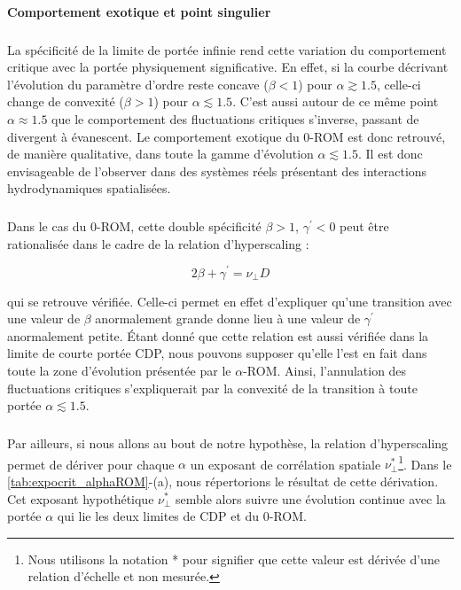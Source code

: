 \paragraph{Comportement exotique et point singulier}

\subparagraph{}La spécificité de la limite de portée infinie rend cette variation du comportement critique avec la portée physiquement significative. En effet, si la courbe décrivant l'évolution du paramètre d'ordre reste concave ($\beta < 1$) pour $\alpha \gtrsim 1.5$, celle-ci change de convexité ($\beta >1$) pour $\alpha \lesssim 1.5$. C'est aussi autour de ce même point $\alpha \approx 1.5$ que le comportement des fluctuations critiques s'inverse, passant de divergent à évanescent. Le comportement exotique du 0-ROM est donc retrouvé, de manière qualitative, dans toute la gamme d'évolution $\alpha \lesssim 1.5$. Il est donc envisageable de l'observer dans des systèmes réels présentant des interactions hydrodynamiques spatialisées.

\subparagraph{}Dans le cas du 0-ROM, cette double spécificité $\beta>1$, $\gamma^\prime<0$ peut être rationalisée dans le cadre de la relation d'hyperscaling \cite{lubeck_universal_2004, mari_absorbing_2022} :

\begin{equation}
	2\beta + \gamma^\prime = \nu_\perp D
\end{equation}

\noindent qui se retrouve vérifiée. Celle-ci permet en effet d'expliquer qu'une transition avec une valeur de $\beta$ anormalement grande donne lieu à une valeur de $\gamma^\prime$ anormalement petite. Étant donné que cette relation est aussi vérifiée dans la limite de courte portée CDP, nous pouvons supposer qu'elle l'est en fait dans toute la zone d'évolution présentée par le $\alpha$-ROM. Ainsi, l'annulation des fluctuations critiques s'expliquerait par la convexité de la transition à toute portée $\alpha \lesssim 1.5$.

\subparagraph{}Par ailleurs, si nous allons au bout de notre hypothèse, la relation d'hyperscaling permet de dériver pour chaque $\alpha$ un exposant de corrélation spatiale $\nu_\perp^*$\footnote{Nous utilisons la notation * pour signifier que cette valeur est dérivée d'une relation d'échelle et non mesurée.}. Dans le \autoref{tab:expocrit_alphaROM}-(a), nous répertorions le résultat de cette dérivation. Cet exposant hypothétique $\nu_\perp^*$ semble alors suivre une évolution continue avec la portée $\alpha$ qui lie les deux limites de CDP et du 0-ROM.

